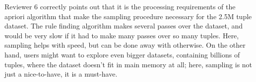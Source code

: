 \documentclass{article}
\begin{document}
Reviewer 6 correctly points out that it is the processing requirements of the apriori algorithm that make the sampling procedure necessary for the 2.5M tuple dataset. The rule finding algorithm makes several passes over the dataset, and would be very slow if it had to make many passes over so many tuples. Here, sampling helps with speed, but can be done away with otherwise. On the other hand, users might want to explore even bigger datasets, containing billions of tuples, where the dataset doesn't fit in main memory at all; here, sampling is not just a nice-to-have, it is a must-have.



\end{document}
